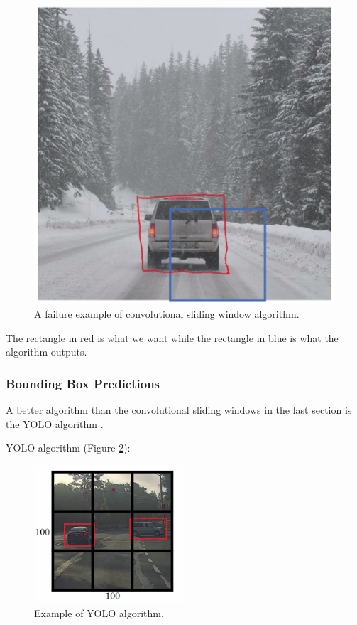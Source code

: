 \begin{figure}[!htbp]
    \centering
    \includegraphics[width=1.0\textwidth, trim={0 0 0 200}, clip]{img/c4/fail2recognize.png}
    \caption{A failure example of convolutional sliding window algorithm.}
    \label{fail2recognize}
\end{figure}

The rectangle in red is what we want while the rectangle in blue is what the algorithm outputs.

\subsubsection{Bounding Box Predictions}
A better algorithm than the convolutional sliding windows in the last section is the YOLO algorithm \cite{redmon2016you}. 

YOLO algorithm (Figure \ref{yolo1}):

\begin{figure}[!htbp]
    \centering
    \includegraphics[width=0.5\textwidth, trim={0 0 0 0}, clip]{img/c4/yolo1.png}
    \caption{Example of YOLO algorithm.}
    \label{yolo1}
\end{figure}


